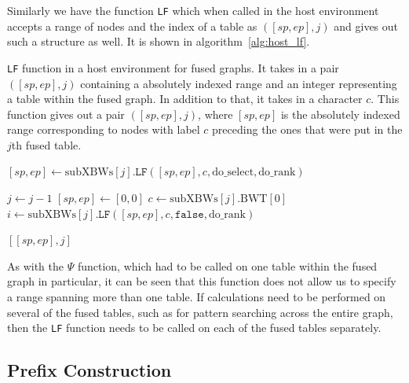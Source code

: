 \documentclass[a4paper,12pt,twoside,BCOR=10mm]{scrbook}
\begin{document}
Similarly we have the function \texttt{LF} which when called in the host environment accepts a range of nodes 
and the index of a table as $ ([sp, ep], j) $ and gives out such a structure as well. 
It is shown in algorithm~\ref{alg:host_lf}.
\begin{algorithm}
\caption[\texttt{LF} function in a host environment for fused graphs]{\texttt{LF} function in a host environment for fused graphs. It takes in a pair $ ([sp, ep], j) $ containing a absolutely indexed range and an integer representing a table within the fused graph. In addition to that, it takes in a character $ c $. This function gives out a pair $ ([sp, ep], j) $, where $ [sp, ep] $ is the absolutely indexed range corresponding to nodes with label $ c $ preceding the ones that were put in the $ j $th fused table.}
\label{alg:host_lf}
\begin{algorithmic}[1]

\State $ [sp, ep] \gets \textrm{subXBWs}[ j ].\texttt{LF}( [sp, ep], c, \textrm{do\_select}, \textrm{do\_rank} ) $

\State \phantom{nl}

	\State $ j \gets j - 1 $
	\State $ [ sp, ep ] \gets [ 0, 0 ] $
	\State $ c \gets \textrm{subXBWs}[ j ].\textrm{BWT}[ 0 ] $
	\State $ i \gets \textrm{subXBWs}[ j ].\texttt{LF}( [sp, ep], c, \texttt{false}, \textrm{do\_rank} ) $
\EndIf

\State \phantom{nl}

\State \Return $ [ [sp, ep], j ] $

\end{algorithmic}
\end{algorithm}
As with the $\Psi$ function, which had to be called on one table within the fused graph in particular, 
it can be seen that this function does not allow us to specify a range spanning more 
than one table. If calculations need to be performed on 
several of the fused tables, such as for pattern searching across the entire graph, 
then the \texttt{LF} function needs to be called on each of the fused tables separately.

\subsection{Prefix Construction}
\end{document}
